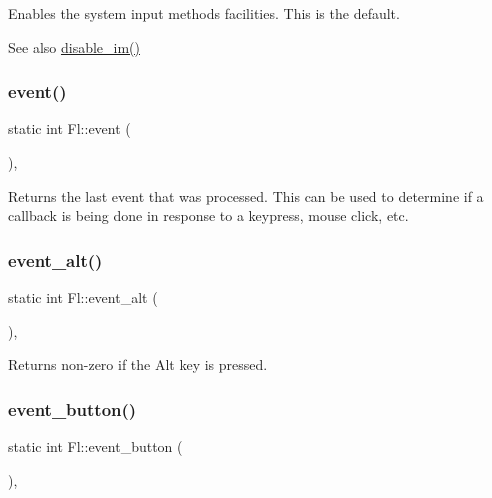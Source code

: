 Enables the system input methods facilities. This is the default. \begin{DoxySeeAlso}{See also}
\hyperlink{group__fl__events_ga792ec093c9ef58930ac0657152bee665}{disable\+\_\+im()} 
\end{DoxySeeAlso}
\mbox{\label{group__fl__events_gac7595e274aaebaa23982125a1363d13f}} 
\subsubsection{\texorpdfstring{event()}{event()}}
{\footnotesize\ttfamily static int Fl\+::event (\begin{DoxyParamCaption}{ }\end{DoxyParamCaption})\hspace{0.3cm}{\ttfamily [inline]}, {\ttfamily [static]}}

Returns the last event that was processed. This can be used to determine if a callback is being done in response to a keypress, mouse click, etc. \mbox{\label{group__fl__events_ga1ee32cc3de557d5a1cc81a1eab944929}} 
\subsubsection{\texorpdfstring{event\+\_\+alt()}{event\_alt()}}
{\footnotesize\ttfamily static int Fl\+::event\+\_\+alt (\begin{DoxyParamCaption}{ }\end{DoxyParamCaption})\hspace{0.3cm}{\ttfamily [inline]}, {\ttfamily [static]}}

Returns non-\/zero if the Alt key is pressed. \mbox{\label{group__fl__events_ga7ae6d99ceb1a2afb8a1dc4455ac941cd}} 
\subsubsection{\texorpdfstring{event\+\_\+button()}{event\_button()}}
{\footnotesize\ttfamily static int Fl\+::event\+\_\+button (\begin{DoxyParamCaption}{ }\end{DoxyParamCaption})\hspace{0.3cm}{\ttfamily [inline]}, {\ttfamily [static]}}


